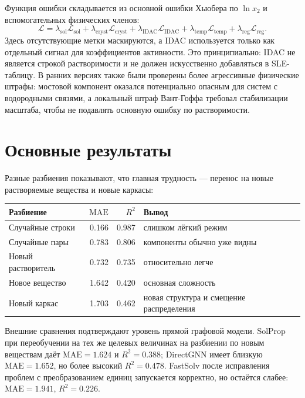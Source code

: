 \documentclass[11pt]{article}
\newcommand{\mae}{\mathrm{MAE}}
\newcommand{\Rtwo}{R^2}
\begin{document}
Функция ошибки складывается из основной ошибки Хьюбера по $\ln x_2$ и вспомогательных физических членов:
\begin{equation*}
    \mathcal L
    = \lambda_{\mathrm{sol}}\mathcal L_{\mathrm{sol}}
    + \lambda_{\mathrm{cryst}}\mathcal L_{\mathrm{cryst}}
    + \lambda_{\mathrm{IDAC}}\mathcal L_{\mathrm{IDAC}}
    + \lambda_{\mathrm{temp}}\mathcal L_{\mathrm{temp}}
    + \lambda_{\mathrm{reg}}\mathcal L_{\mathrm{reg}}.
\end{equation*}
Здесь отсутствующие метки маскируются, а IDAC используется только как отдельный сигнал для коэффициентов активности. Это принципиально: IDAC не является строкой растворимости и не должен искусственно добавляться в SLE-таблицу. В ранних версиях также были проверены более агрессивные физические штрафы: мостовой компонент оказался потенциально опасным для систем с водородными связями, а локальный штраф Вант-Гоффа требовал стабилизации масштаба, чтобы не подавлять основную ошибку по растворимости.

\section{Основные результаты}

Разные разбиения показывают, что главная трудность --- перенос на новые растворяемые вещества и новые каркасы:

\begin{center}
\begin{tabular}{lrrl}
\toprule
Разбиение & $\mae$ & $\Rtwo$ & Вывод \\
\midrule
Случайные строки & 0.166 & 0.987 & слишком лёгкий режим \\
Случайные пары & 0.783 & 0.806 & компоненты обычно уже видны \\
Новый растворитель & 0.732 & 0.735 & относительно легче \\
Новое вещество & 1.642 & 0.420 & основная сложность \\
Новый каркас & 1.703 & 0.462 & новая структура и смещение распределения \\
\bottomrule
\end{tabular}
\end{center}

Внешние сравнения подтверждают уровень прямой графовой модели. SolProp при переобучении на тех же целевых величинах на разбиении по новым веществам даёт $\mae=1.624$ и $\Rtwo=0.388$; DirectGNN имеет близкую $\mae=1.652$, но более высокий $\Rtwo=0.478$. FastSolv после исправления проблем с преобразованием единиц запускается корректно, но остаётся слабее: $\mae=1.941$, $\Rtwo=0.226$.
\end{document}

